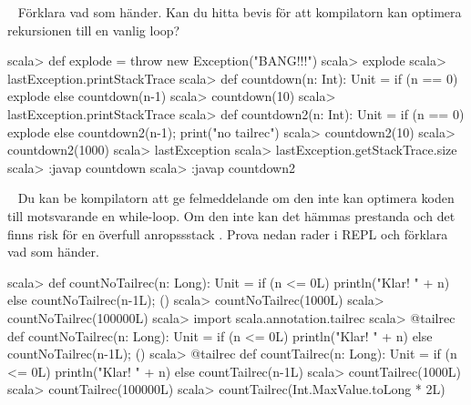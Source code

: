 \QUESTBEGIN

\Task  \what~  Förklara vad som händer. Kan du hitta bevis för att kompilatorn kan optimera rekursionen till en vanlig loop?

\begin{REPL}
scala> def explode = throw new Exception("BANG!!!")
scala> explode
scala> lastException.printStackTrace
scala> def countdown(n: Int): Unit =
         if (n == 0) explode else countdown(n-1)
scala> countdown(10)
scala> lastException.printStackTrace
scala> def countdown2(n: Int): Unit =
         if (n == 0) explode else {countdown2(n-1); print("no tailrec")}
scala> countdown2(10)
scala> countdown2(1000)
scala> lastException
scala> lastException.getStackTrace.size
scala> :javap countdown
scala> :javap countdown2
\end{REPL}

\SOLUTION


\QUESTEND




\QUESTBEGIN

\Task  \what~  Du kan be kompilatorn att ge felmeddelande om den inte kan optimera koden till motsvarande en while-loop. Om den inte kan det hämmas prestanda och det finns risk för en överfull anropssstack . Prova nedan rader i REPL och förklara vad som händer.
\begin{REPL}
scala> def countNoTailrec(n: Long): Unit =
         if (n <= 0L) println("Klar! " + n) else {countNoTailrec(n-1L); ()}
scala> countNoTailrec(1000L)
scala> countNoTailrec(100000L)
scala> import scala.annotation.tailrec
scala> @tailrec def countNoTailrec(n: Long): Unit =
         if (n <= 0L) println("Klar! " + n) else {countNoTailrec(n-1L); ()}
scala> @tailrec def countTailrec(n: Long): Unit =
         if (n <= 0L) println("Klar! " + n) else countTailrec(n-1L)
scala> countTailrec(1000L)
scala> countTailrec(100000L)
scala> countTailrec(Int.MaxValue.toLong * 2L)
\end{REPL}\SOLUTION


\QUESTEND
